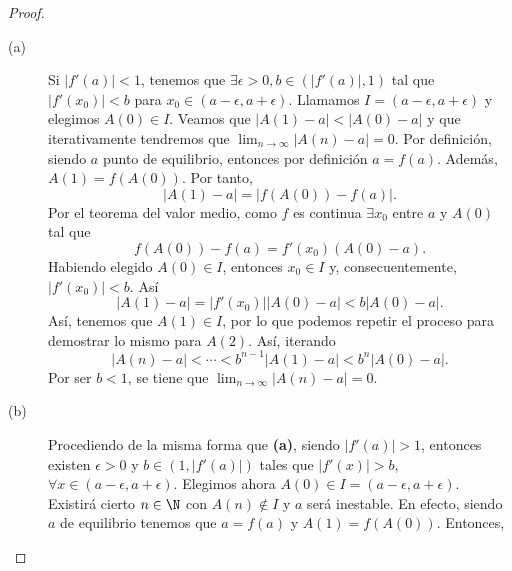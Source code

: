 \begin{proof}
\begin{description}
\item[(a)] Si $\displaystyle \left|f'\left(a\right)\right|<1 $, tenemos que $\displaystyle \exists \epsilon > 0, b \in \left( \left|f'\left(a\right)\right|, 1\right) $ tal que $\displaystyle \left|f'\left(x_{0}\right)\right|<b $ para $\displaystyle x_{0} \in \left(a-\epsilon, a + \epsilon \right) $. Llamamos $\displaystyle I = \left(a - \epsilon , a + \epsilon \right) $ y elegimos $\displaystyle A\left(0\right) \in I $. Veamos que $\displaystyle \left|A\left(1\right)-a\right| < \left|A\left(0\right)-a\right| $ y que iterativamente tendremos que $\displaystyle \lim_{n \to \infty} \left|A\left(n\right)-a\right| = 0 $.
Por definición, siendo $\displaystyle a $ punto de equilibrio, entonces por definición $\displaystyle a = f\left(a\right) $. Además, $\displaystyle A\left(1\right) = f\left(A\left(0\right)\right) $. Por tanto, 
\[ \left|A\left(1\right)-a\right| = \left|f\left(A\left(0\right)\right)-f\left(a\right)\right| .\]
Por el teorema del valor medio, como $\displaystyle f $ es continua $\displaystyle \exists x_{0}  $ entre $\displaystyle a $ y $\displaystyle A\left(0\right) $ tal que 
\[ f\left(A\left(0\right)\right)-f\left(a\right) = f'\left(x_{0}\right) \left(A\left(0\right)-a\right) .\]
Habiendo elegido $\displaystyle A\left(0\right) \in I $, entonces $\displaystyle x_{0} \in I $ y, consecuentemente, $\displaystyle \left|f'\left(x_{0}\right)\right| < b $. Así
\[ \left|A\left(1\right)-a\right| = \left|f'\left(x_{0}\right)\right| \left|A\left(0\right)-a\right| < b\left|A\left(0\right)-a\right|.\]
Así, tenemos que $\displaystyle A\left(1\right) \in I $, por lo que podemos repetir el proceso para demostrar lo mismo para $\displaystyle A\left(2\right) $. Así, iterando
\[ \left|A\left(n\right)-a\right| < \cdots < b^{n-1}\left|A\left(1\right)-a\right|< b^{n}\left|A\left(0\right)-a\right| .\]
Por ser $\displaystyle b < 1 $, se tiene que $\displaystyle \lim_{n \to \infty} \left|A\left(n\right)-a\right| = 0 $.
\item[(b)] Procediendo de la misma forma que \textbf{(a)}, siendo $\displaystyle \left|f'\left(a\right)\right| > 1 $, entonces existen $\displaystyle \epsilon > 0 $ y $\displaystyle b \in \left(1, \left|f'\left(a\right)\right|\right) $ tales que $\displaystyle \left|f'\left(x\right)\right| > b $, $\displaystyle \forall x \in \left(a - \epsilon, a + \epsilon \right) $. Elegimos ahora $\displaystyle A\left(0\right) \in I = \left(a-\epsilon, a+ \epsilon \right) $.
	Existirá cierto $\displaystyle n \in \N $ con $\displaystyle A\left(n\right) \not\in I $ y $\displaystyle a $ será inestable. En efecto, siendo $\displaystyle a $ de equilibrio tenemos que $\displaystyle a = f\left(a\right) $ y $\displaystyle A\left(1\right) = f\left(A\left(0\right)\right) $. Entonces,

\end{description}
\end{proof}
